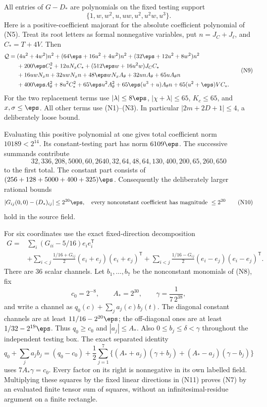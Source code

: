 All entries of $G-D_*$ are polynomials on the fixed testing support
\[
 \{1,w,w^2,u,uw,u^2,u^2w,u^3\}.                 \tag{N8}
\]
Here is a positive-coefficient majorant for the absolute coefficient
polynomial of (N5). Treat its root letters as formal nonnegative
variables, put $n=J_C+J_\ell$, and $C_*=T+4V$. Then
\[
\begin{split}
 \mathcal Q={}&(4u^2+4w^2)n^2
 +(64\eps+16u^2+4w^2)n^2
 +(32\eps+12u^2+8w^2)n^2\\
 &+200\eps C_*^2+12uN_xC_*
 +(512\eps w+16u^2w)J_CC_*\\
 &+16uwN_xn+32uwN_xn+48\eps wN_xA_\theta
 +32unA_\theta+65uA_\theta n\\
 &+400\eps A_\theta^2+8u^2C_*^2
 +65\eps u^2A_\theta^2
 +65\eps(u^3+u)A_\theta n
 +65(u^2+\eps)VC_* .
\end{split}                                                   \tag{N9}
\]
For the two replacement terms use $|\lambda|\le8\eps$,
$|\chi+\lambda|\le65$, $K_c\le65$, and $x,\sigma\le\eps$.
All other terms use (N1)--(N3). In particular
$|2m+2D+1|\le4$, a deliberately loose bound.

Evaluating this positive polynomial at one gives total coefficient
norm $10189<2^{14}$. Its constant-testing part has norm
$6109\eps$. The successive summands contribute
\[
32,336,208,5000,60,2640,32,64,48,64,130,400,200,65,260,650
\]
to the first total. The constant part consists of
$(256+128+5000+400+325)\eps$.
Consequently the deliberately larger rational bounds
\[
 |G_{ij}(0,0)-(D_*)_{ij}|\le2^{20}\eps,
 \quad\text{every nonconstant coefficient has magnitude }\le2^{20}
                                                               \tag{N10}
\]
hold in the source field.

For six coordinates use the exact fixed-direction decomposition
\[
\begin{split}
 G={}&\sum_i(G_{ii}-5/16)e_ie_i^{\mathsf T}\\
 &+\sum_{i<j}\frac{1/16+G_{ij}}2(e_i+e_j)(e_i+e_j)^{\mathsf T}
 +\sum_{i<j}\frac{1/16-G_{ij}}2(e_i-e_j)(e_i-e_j)^{\mathsf T}.
\end{split}                                                    \tag{N11}
\]
There are $36$ scalar channels. Let $b_1,\ldots,b_7$ be the
nonconstant monomials of (N8), fix
\[
 c_0=2^{-8},\qquad A_*=2^{30},\qquad
 \gamma=\frac1{7\,2^{38}},
\]
and write a channel as $q_0(c)+\sum_j a_j(c)b_j(t)$.
The diagonal constant channels are at least $11/16-2^{20}\eps$;
the off-diagonal ones are at least $1/32-2^{19}\eps$.
Thus $q_0\ge c_0$ and $|a_j|\le A_*$. Also
$0\le b_j\le\delta<\gamma$ throughout the independent testing box.
The exact separated identity
\[
 q_0+\sum_ja_jb_j=(q_0-c_0)
 +\frac12\sum_{j=1}^7
 \{(A_*+a_j)(\gamma+b_j)+(A_*-a_j)(\gamma-b_j)\}       \tag{N12}
\]
uses $7A_*\gamma=c_0$. Every factor on its right is nonnegative
in its own labelled field. Multiplying these squares by the fixed
linear directions in (N11) proves (N7) by an evaluated finite
tensor sum of squares, without an infinitesimal-residue argument
on a finite rectangle.

